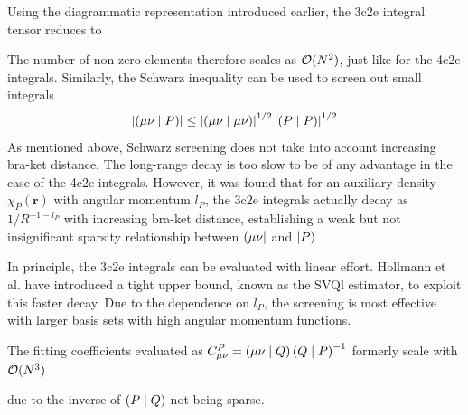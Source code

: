 Using the diagrammatic representation introduced earlier, the 3c2e integral tensor reduces to
\begin{center}
\end{center}
The number of non-zero elements therefore scales as $\mathcal{O}(N^{2})$, just like for the 4c2e integrals. Similarly, the Schwarz inequality can be used to screen out small integrals
\begin{equation}
\left\lvert \left( \mu\nu \mid P \right) \right\rvert \leq \left\lvert \left( \mu\nu \mid \mu\nu \right) \right\rvert^{1/2} \left\lvert \left( P \mid P \right) \right\rvert^{1/2}
\end{equation}
\noindent As mentioned above, Schwarz screening does not take into account increasing bra-ket distance. The long-range decay is too slow to be of any advantage in the case of the 4c2e integrals. However, it was found \cite{Hol2015} that for an auxiliary density $\chi_P(\mathbf{r})$ with angular momentum $l_P$, the 3c2e integrals actually decay as $1/R^{-1 - l_P}$ with increasing bra-ket distance, establishing a weak but not insignificant sparsity relationship between $\left( \mu\nu \right\rvert$ and $\left\lvert P \right)$ 
\begin{center}
\end{center}
\noindent In principle, the 3c2e integrals can be evaluated with linear effort. Hollmann et al. \cite{Hol2015} have introduced a tight upper bound, known as the SVQl estimator, to exploit this faster decay. Due to the dependence on $l_P$, the screening is most effective with larger basis sets with high angular momentum functions.

The fitting coefficients evaluated as $C^P_{\mu\nu} = \left( \mu\nu \mid Q \right) \left( Q \mid P \right)^{-1}$ formerly scale with $\mathcal{O}(N^{3})$
\begin{center}
\end{center}
\noindent due to the inverse of $\left( P \mid Q \right)$ not being sparse. 

